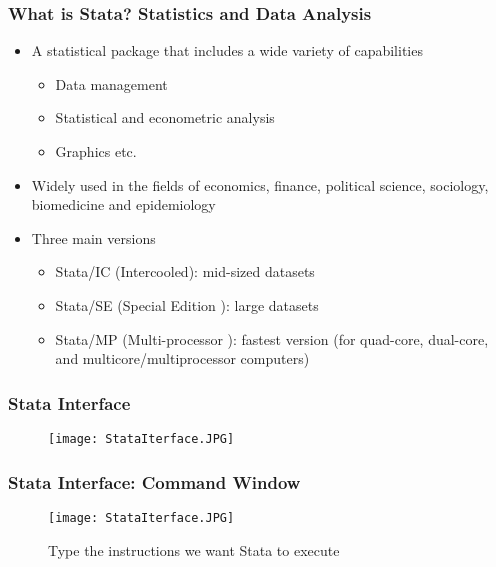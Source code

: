 \documentclass[11pt, xcolor=x11names,compress]{beamer}
\begin{document}
\begin{frame}[fragile,t]
\frametitle{What is Stata? Statistics and Data Analysis}
\begin{itemize}
    \item A statistical package that includes a wide variety of capabilities
    \begin{itemize}
        \item Data management
        \item Statistical and econometric analysis
        \item Graphics etc.
    \end{itemize}
    \item Widely used in the fields of economics, finance, political science, sociology, biomedicine and epidemiology
    \item Three main versions
    \begin{itemize}
        \item Stata/IC (Intercooled): mid-sized datasets
        \item Stata/SE (Special Edition ): large datasets
        \item Stata/MP (Multi-processor ): fastest version (for quad-core, dual-core, and multicore/multiprocessor computers)
    \end{itemize}
\end{itemize}
\end{frame}

\begin{frame}[fragile,t]
\frametitle{Stata Interface}
\begin{figure}
    \centering
    \texttt{[image: StataIterface.JPG]}
    \caption{}
    \label{fig:my_label}
\end{figure}
\end{frame}

\begin{frame}[fragile,t]
\frametitle{Stata Interface: Command Window}
\begin{figure}
    \centering
    \texttt{[image: StataIterface.JPG]}
    \label{fig:my_label}
    \caption{Type the instructions we want Stata to execute}
\end{figure}
\end{frame}
\end{document}
